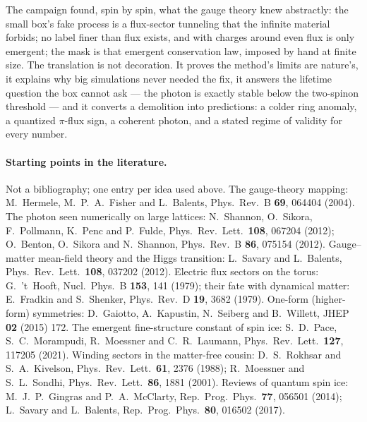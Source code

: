 \documentclass[11pt,a4paper]{article}
\begin{document}
\endgroup

\begin{plainwords}
The campaign found, spin by spin, what the gauge theory knew abstractly:
the small box's fake process is a flux-sector tunneling that the infinite
material forbids; no label finer than flux exists, and with charges around
even flux is only emergent; the mask is that emergent conservation law,
imposed by hand at finite size.  The translation is not decoration.  It
proves the method's limits are nature's, it explains why big simulations
never needed the fix, it answers the lifetime question the box cannot ask
--- the photon is exactly stable below the two-spinon threshold --- and it
converts a demolition into predictions: a colder ring anomaly, a quantized
$\pi$-flux sign, a coherent photon, and a stated regime of validity for
every number.
\end{plainwords}

\paragraph{Starting points in the literature.}  Not a bibliography; one
entry per idea used above.  The gauge-theory mapping: M.~Hermele,
M.~P.~A.~Fisher and L.~Balents, Phys.\ Rev.\ B \textbf{69}, 064404 (2004).
The photon seen numerically on large lattices: N.~Shannon, O.~Sikora,
F.~Pollmann, K.~Penc and P.~Fulde, Phys.\ Rev.\ Lett.\ \textbf{108}, 067204
(2012); O.~Benton, O.~Sikora and N.~Shannon, Phys.\ Rev.\ B \textbf{86},
075154 (2012).  Gauge--matter mean-field theory and the Higgs transition:
L.~Savary and L.~Balents, Phys.\ Rev.\ Lett.\ \textbf{108}, 037202 (2012).
Electric flux sectors on the torus: G.~'t~Hooft, Nucl.\ Phys.\ B
\textbf{153}, 141 (1979); their fate with dynamical matter: E.~Fradkin and
S.~Shenker, Phys.\ Rev.\ D \textbf{19}, 3682 (1979).  One-form (higher-form)
symmetries: D.~Gaiotto, A.~Kapustin, N.~Seiberg and B.~Willett, JHEP
\textbf{02} (2015) 172.  The emergent fine-structure constant of spin ice:
S.~D.~Pace, S.~C.~Morampudi, R.~Moessner and C.~R.~Laumann, Phys.\ Rev.\
Lett.\ \textbf{127}, 117205 (2021).  Winding sectors in the matter-free
cousin: D.~S.~Rokhsar and S.~A.~Kivelson, Phys.\ Rev.\ Lett.\ \textbf{61},
2376 (1988); R.~Moessner and S.~L.~Sondhi, Phys.\ Rev.\ Lett.\ \textbf{86},
1881 (2001).  Reviews of quantum spin ice: M.~J.~P.~Gingras and
P.~A.~McClarty, Rep.\ Prog.\ Phys.\ \textbf{77}, 056501 (2014); L.~Savary
and L.~Balents, Rep.\ Prog.\ Phys.\ \textbf{80}, 016502 (2017).
\end{document}
